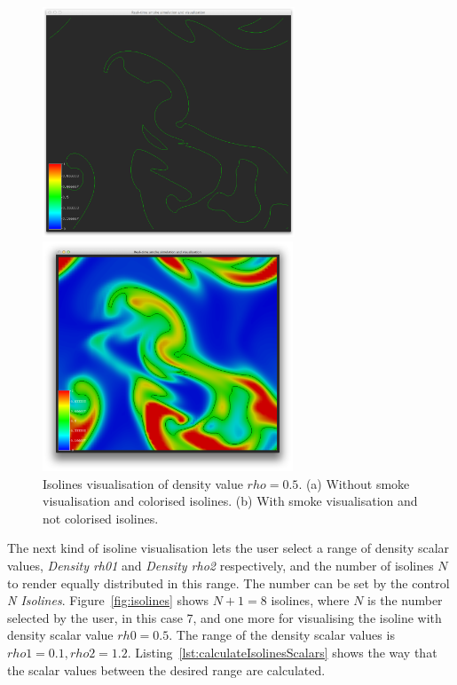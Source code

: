 \begin{figure}[htbp]
\begin{center}
\begin{minipage}[t]{0.48\textwidth}
\includegraphics[height=2.7in]{figures/isolines/isoline.png}
\end{minipage}
\begin{minipage}[t]{0.48\textwidth}
\includegraphics[height=2.7in]{figures/isolines/isolineSmoke.png}
\end{minipage}
\caption{Isolines visualisation of density value $rho = 0.5$. (a) Without smoke visualisation and colorised isolines. (b) With smoke visualisation and not colorised isolines.}
\label{fig:isoline}
\end{center}
\end{figure}

The next kind of isoline visualisation lets the user select a range of density scalar values, \emph{Density rh01} and \emph{Density rho2} respectively, and the number of isolines $N$ to render equally distributed in this range. The number can be set by the control \emph{N Isolines}. Figure~\ref{fig:isolines} shows $N + 1 = 8$ isolines, where $N$ is the number selected by the user, in this case 7, and one more for visualising the isoline with density scalar value $rh0 = 0.5$. The range of the density scalar values is $rho1 = 0.1, rho2 = 1.2$. Listing~\ref{lst:calculateIsolinesScalars} shows the way that the scalar values between the desired range are calculated.


